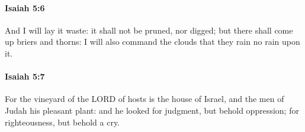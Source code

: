 		\paragraph{Isaiah 5:6} %
			\label{ISAIAH-5-6}

			And I will lay it waste: it shall not be pruned, nor digged; but there shall come up briers and thorns: I will also command the clouds that they rain no rain upon it.


		\paragraph{Isaiah 5:7} %
			\label{ISAIAH-5-7}

			For the vineyard of the LORD of hosts is the house of Israel, and the men of Judah his pleasant plant: and he looked for judgment, but behold oppression; for righteousness, but behold a cry.


